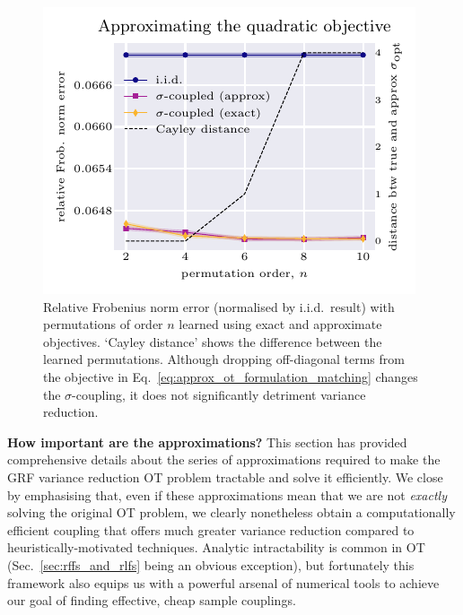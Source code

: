 \begin{figure}
\vspace{-6.6mm} \hspace{4mm}
    \includegraphics{images/approx_obj.pdf} 
     \vspace{-3mm}
\caption{Relative Frobenius norm error (normalised by i.i.d.~result) with permutations of order $n$ learned using exact and approximate objectives. 
`Cayley distance' shows the difference between the learned permutations. 
Although dropping off-diagonal terms from the objective in Eq.~\ref{eq:approx_ot_formulation_matching} changes the $\sigma$-coupling, it does not significantly detriment variance reduction. }\label{fig:approx_obj} \vspace{-3mm}
\end{figure} 
\textbf{How important are the approximations?}
This section has provided comprehensive details about the series of approximations required to make the GRF variance reduction OT problem tractable and solve it efficiently. 
We close by emphasising that, even if these approximations mean that we are not \emph{exactly} solving the original OT problem, we clearly nonetheless obtain a computationally efficient coupling that offers much greater variance reduction compared to heuristically-motivated techniques.
Analytic intractability is common in OT (Sec.~\ref{sec:rffs_and_rlfs} being an obvious exception), but fortunately this framework also equips us with a powerful arsenal of numerical tools to achieve our goal of finding effective, cheap sample couplings.


